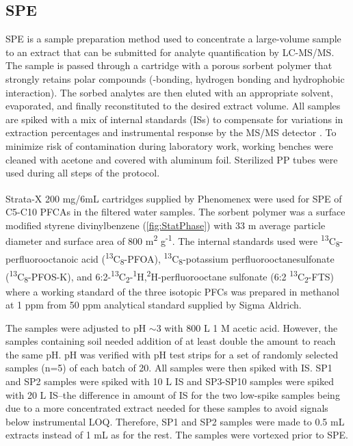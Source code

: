 \subsection{SPE}
SPE is a sample preparation method used to concentrate a large-volume sample to an extract that can be submitted for analyte quantification by LC-MS/MS. The sample is passed through a cartridge with a porous sorbent polymer that strongly retains polar compounds (\textpi-\textpi bonding, hydrogen bonding and hydrophobic interaction). The sorbed analytes are then eluted with an appropriate solvent, evaporated, and finally reconstituted to the desired extract volume. All samples are spiked with a mix of internal standards (ISs) to compensate for variations in extraction percentages and instrumental response by the MS/MS detector \citep{arvaniti2014}. To minimize risk of contamination during laboratory work, working benches were cleaned with acetone and covered with aluminum foil. Sterilized PP tubes were used during all steps of the protocol.

Strata-X\textsuperscript{\textregistered} 200 mg/6mL cartridges supplied by Phenomenex were used for SPE of C5-C10 PFCAs in the filtered water samples. The sorbent polymer was a surface modified styrene divinylbenzene (\cref{fig:StatPhase}) with 33 \textmu m average particle diameter and surface area of 800 m\textsuperscript{2} g\textsuperscript{-1}. The internal standards used were \textsuperscript{13}C\textsubscript{8}-perfluorooctanoic acid  (\textsuperscript{13}C\textsubscript{8}-PFOA), \textsuperscript{13}C\textsubscript{8}-potassium perfluorooctanesulfonate (\textsuperscript{13}C\textsubscript{8}-PFOS-K), and 6:2-\textsuperscript{13}C\textsubscript{2}-\textsuperscript{1}H,\textsuperscript{2}H-perfluorooctane sulfonate  (6:2 \textsuperscript{13}C\textsubscript{2}-FTS) where a working standard of the three isotopic PFCs was prepared in methanol at 1 ppm from 50 ppm analytical standard supplied by Sigma Aldrich.

The samples were adjusted to pH $\sim$3 with 800 \textmu L 1 M acetic acid. However, the samples containing soil needed addition of at least double the amount to reach the same pH. pH was verified with pH test strips for a set of randomly selected samples (n=5) of each batch of 20. All samples were then spiked with IS. SP1 and SP2 samples were spiked with 10 \textmu L IS and SP3-SP10 samples were spiked with 20 \textmu L IS--the difference in amount of IS for the two low-spike samples being due to a more concentrated extract needed for these samples to avoid signals below instrumental LOQ. Therefore, SP1 and SP2 samples were made to 0.5 mL extracts instead of 1 mL as for the rest. The samples were vortexed prior to SPE.

